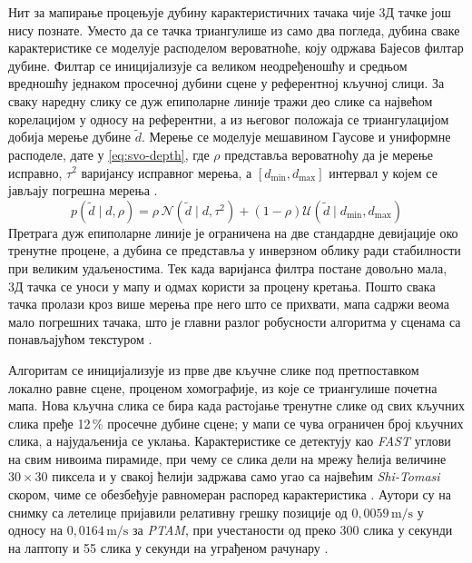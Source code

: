 \documentclass[12pt]{article}
\begin{document}
Нит за мапирање процењује дубину карактеристичних тачака чије 3Д тачке још
нису познате. Уместо да се тачка триангулише из само два погледа, дубина сваке
карактеристике се моделује расподелом вероватноће, коју одржава Бајесов филтар
дубине. Филтар се иницијализује са великом неодређеношћу и средњом вредношћу
једнаком просечној дубини сцене у референтној кључној слици. За сваку наредну
слику се дуж епиполарне линије тражи део слике са највећом корелацијом у односу
на референтни, а из његовог положаја се триангулацијом добија мерење дубине
$\tilde{d}$. Мерење се моделује мешавином Гаусове и униформне расподеле, дате у
\eqref{eq:svo-depth}, где $\rho$ представља вероватноћу да је мерење исправно,
$\tau^2$ варијансу исправног мерења, а $[d_{\min}, d_{\max}]$ интервал у којем
се јављају погрешна мерења \cite{forster2014svo}.
\begin{equation}
	p\left(\tilde{d} \mid d, \rho\right)
	= \rho \, \mathcal{N}\!\left(\tilde{d} \mid d, \tau^2\right)
	+ \left(1 - \rho\right) \mathcal{U}\!\left(\tilde{d} \mid d_{\min}, d_{\max}\right)
	\label{eq:svo-depth}
\end{equation}
Претрага дуж епиполарне линије је ограничена на две стандардне девијације око
тренутне процене, а дубина се представља у инверзном облику ради стабилности
при великим удаљеностима. Тек када варијанса филтра постане довољно мала, 3Д
тачка се уноси у мапу и одмах користи за процену кретања. Пошто свака тачка
пролази кроз више мерења пре него што се прихвати, мапа садржи веома мало
погрешних тачака, што је главни разлог робусности алгоритма у сценама са
понављајућом текстуром \cite{forster2014svo}.

Алгоритам се иницијализује из прве две кључне слике под претпоставком локално
равне сцене, проценом хомографије, из које се триангулише почетна мапа. Нова
кључна слика се бира када растојање тренутне слике од свих кључних слика пређе
12\,\% просечне дубине сцене; у мапи се чува ограничен број кључних слика, а
најудаљенија се уклања. Карактеристике се детектују као \textit{FAST} углови на
свим нивоима пирамиде, при чему се слика дели на мрежу ћелија величине
$30 \times 30$ пиксела и у свакој ћелији задржава само угао са највећим
\textit{Shi-Tomasi} скором, чиме се обезбеђује равномеран распоред
карактеристика \cite{forster2014svo}. Аутори су на снимку са летелице
пријавили релативну грешку позиције од $0{,}0059\,\mathrm{m/s}$ у односу на
$0{,}0164\,\mathrm{m/s}$ за \textit{PTAM}, при учестаности од преко 300 слика
у секунди на лаптопу и 55 слика у секунди на уграђеном рачунару
\cite{forster2014svo}.
\end{document}
